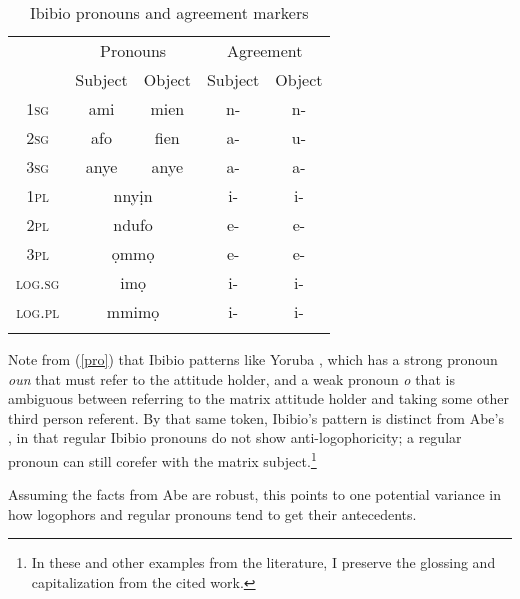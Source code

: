 \documentclass[output=paper]{langscibook}
\begin{document}
\begin{table}
\centering
\begin{tabular}{>{\scshape}ccccc}
\lsptoprule
	& \multicolumn{2}{c}{Pronouns}	&	\multicolumn{2}{c}{Agreement}	\\\cmidrule(lr){2-3}\cmidrule(lr){4-5}
	&	Subject		&	Object		&	Subject 	&	Object			\\ \midrule
1sg	&	ami	&	mien	&	n- & n-	\\
2sg	&	afo	&	fien	& a-	& u- 		\\
3sg	&	anye	&	anye	& a-	&	a-	\\ 
1pl	&	\multicolumn{2}{c}{nny\d{i}n}	&	i-	&	i-	\\
2pl	&	\multicolumn{2}{c}{ndufo}	& e-	& e-	\\
3pl	&	\multicolumn{2}{c}{\d{o}mm\d{o}} & e-		& e- \\
\textsc{log.sg}	& \multicolumn{2}{c}{im\d{o}}	&	i-	& i-	\\
\textsc{log.pl}	&	\multicolumn{2}{c}{mmim\d{o}}	& i-	& i-	\\
\lspbottomrule
\end{tabular}
\caption{Ibibio pronouns and agreement markers}
\end{table}

Note from (\ref{pro}) that Ibibio patterns like Yoruba \citep[(\ref{yor})]{Adesola2005}, which has a strong pronoun \textit{oun} that must refer to the attitude holder, and a weak pronoun \textit{o} that is ambiguous between referring to the matrix attitude holder and taking some other third person referent. By that same token, Ibibio's pattern is distinct from Abe's \citep[(\ref{abe})]{Koopman1989}, in that regular Ibibio pronouns do not show anti-logophoricity; a regular pronoun can still corefer with the matrix subject.\footnote{In these and other examples from the literature, I preserve the glossing and capitalization from the cited work.}
\begin{exe}
	
\end{exe}
Assuming the facts from Abe are robust, this points to one potential variance in how logophors and regular pronouns tend to get their antecedents.
\end{document}
